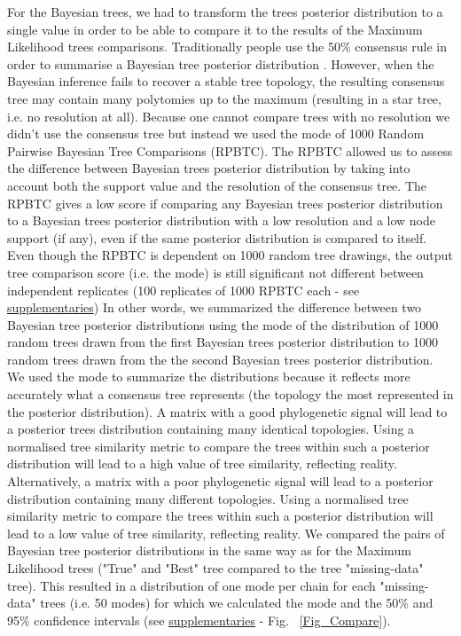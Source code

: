 \documentclass[12pt,letterpaper]{article}
\begin{document}
For the Bayesian trees, we had to transform the trees posterior distribution to a single value in order to be able to compare it to the results of the Maximum Likelihood trees comparisons.
Traditionally people use the 50\% consensus rule in order to summarise a Bayesian tree posterior distribution \citep[e.g.][]{Ronquist2012mrbayes}.
However, when the Bayesian inference fails to recover a stable tree topology, the resulting consensus tree may contain many polytomies up to the maximum (resulting in a star tree, i.e. no resolution at all).
Because one cannot compare trees with no resolution we didn't use the consensus tree but instead we used the mode of 1000 Random Pairwise Bayesian Tree Comparisons (RPBTC).
The RPBTC allowed us to assess the difference between Bayesian trees posterior distribution by taking into account both the support value and the resolution of the consensus tree.
The RPBTC gives a low score if comparing any Bayesian trees posterior distribution to a Bayesian trees posterior distribution with a low resolution and a low node support (if any), even if the same posterior distribution is compared to itself.
Even though the RPBTC is dependent on 1000 random tree drawings, the output tree comparison score (i.e. the mode) is still significant not different between independent replicates (100 replicates of 1000 RPBTC each - see \hyperref[supplementaries]{supplementaries})
%
%
%
In other words, we summarized the difference between two Bayesian tree posterior distributions using the mode of the distribution of 1000 random trees drawn from the first Bayesian trees posterior distribution to 1000 random trees drawn from the the second Bayesian trees posterior distribution.
We used the mode to summarize the distributions because it reflects more accurately what a consensus tree represents (the topology the most represented in the posterior distribution).
A matrix with a good phylogenetic signal will lead to a posterior trees distribution containing many identical topologies.
Using a normalised tree similarity metric to compare the trees within such a posterior distribution will lead to a high value of tree similarity, reflecting reality.
Alternatively, a matrix with a poor phylogenetic signal will lead to a posterior distribution containing many different topologies.
Using a normalised tree similarity metric to compare the trees within such a posterior distribution will lead to a low value of tree similarity, reflecting reality. %
We compared the pairs of Bayesian tree posterior distributions in the same way as for the Maximum Likelihood trees ("True" and "Best" tree compared to the tree "missing-data" tree).
This resulted in a distribution of one mode per chain for each "missing-data" trees (i.e. 50 modes) for which we calculated the mode and the 50\% and 95\% confidence intervals (see \hyperref[supplementaries]{supplementaries} - Fig. ~\ref{Fig_Compare}).
\end{document}
